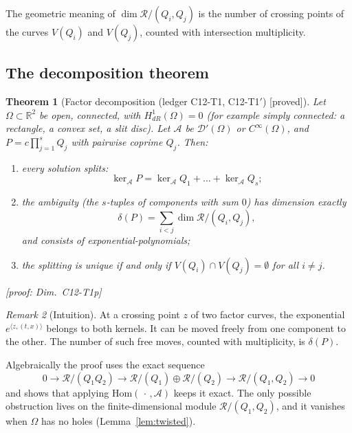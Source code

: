 \documentclass[11pt]{article}
\theoremstyle{plain}
\newtheorem{theorem}{Theorem}[section]
\theoremstyle{definition}
\theoremstyle{remark}
\newtheorem{remark}[theorem]{Remark}
\newcommand{\R}{\mathbb{R}}
\newcommand{\ring}{\mathcal{R}}            %
\newcommand{\Var}{V}                        %
\DeclareMathOperator{\dimc}{dim}
\newcommand{\badge}[2]{\textcolor{#1}{\textsf{\footnotesize[#2]}}}
\newcommand{\proved}[1][]{\badge{cC}{proved#1}}
\newcommand{\led}[1]{\textcolor{cG}{\textsf{\footnotesize(ledger #1)}}}
\newenvironment{intuition}{\begin{remark}[Intuition]}{\end{remark}}
\newcommand{\dimref}[1]{\textsf{\footnotesize[proof: Dim.~#1]}}
\begin{document}
The geometric meaning of $\dimc\ring/(Q_i,Q_j)$ is the number of crossing points of the curves $\Var(Q_i)$ and $\Var(Q_j)$, counted with intersection multiplicity.

\subsection{The decomposition theorem}

\begin{theorem}[{Factor decomposition \led{C12-T1, C12-T1$'$} \proved}]\label{f:thm:factor}
Let $\Omega\subset\R^2$ be open, connected, with $H^1_{dR}(\Omega)=0$ (for example simply connected: a rectangle, a convex set, a slit disc). Let $\mathcal A$ be $\mathcal D'(\Omega)$ or $C^\infty(\Omega)$, and $P=c\prod_{j=1}^sQ_j$ with pairwise coprime $Q_j$. Then:
\begin{enumerate}[label=(\roman*)]
\item every solution splits:
\[
\ker_{\mathcal A}P=\ker_{\mathcal A}Q_1+\dots+\ker_{\mathcal A}Q_s ;
\]
\item the ambiguity (the $s$-tuples of components with sum $0$) has dimension exactly
\[
\delta(P)=\sum_{i<j}\dimc\ring/(Q_i,Q_j),
\]
and consists of exponential-polynomials;
\item the splitting is unique if and only if $\Var(Q_i)\cap\Var(Q_j)=\emptyset$ for all $i\ne j$.
\end{enumerate}
\dimref{C12-T1p}
\end{theorem}

\begin{intuition}
At a crossing point $z$ of two factor curves, the exponential $e^{\langle z,(t,x)\rangle}$ belongs to both kernels. It can be moved freely from one component to the other. The number of such free moves, counted with multiplicity, is $\delta(P)$.

Algebraically the proof uses the exact sequence
\[
0\to\ring/(Q_1Q_2)\to\ring/(Q_1)\oplus\ring/(Q_2)\to\ring/(Q_1,Q_2)\to0
\]
and shows that applying $\mathrm{Hom}(\,\cdot\,,\mathcal A)$ keeps it exact. The only possible obstruction lives on the finite-dimensional module $\ring/(Q_1,Q_2)$, and it vanishes when $\Omega$ has no holes (Lemma~\ref{lem:twisted}).
\end{intuition}
\end{document}
